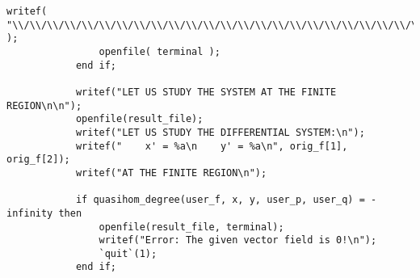 \documentclass[a4paper,10pt]{article}
\begin{document}
\begin{lstlisting}[name=main]
                writef( "\\/\\/\\/\\/\\/\\/\\/\\/\\/\\/\\/\\/\\/\\/\\/\\/\\/\\/\\/\\/\\/\\/\\/\\/\\/\\/\\/\\/\\/\\/\\/\\/\\/\\/\\/\\/\\/\\/\\/\\/\n\n" );
                openfile( terminal );
            end if;

            writef("LET US STUDY THE SYSTEM AT THE FINITE REGION\n\n");
            openfile(result_file);
            writef("LET US STUDY THE DIFFERENTIAL SYSTEM:\n");
            writef("    x' = %a\n    y' = %a\n", orig_f[1], orig_f[2]);
            writef("AT THE FINITE REGION\n");

            if quasihom_degree(user_f, x, y, user_p, user_q) = -infinity then
                openfile(result_file, terminal);
                writef("Error: The given vector field is 0!\n");
                `quit`(1);
            end if;


\end{lstlisting}
\end{document}
